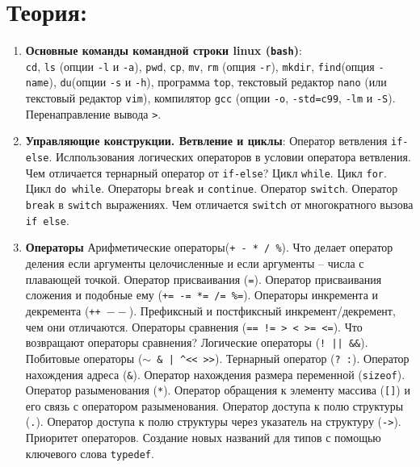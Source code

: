 \documentclass{article}
\begin{document}

\section*{Теория:}
\begin{enumerate}
\item \textbf{Основные команды командной строки linux (\texttt{bash})}:\\
 \texttt{cd}, \texttt{ls} (опции \texttt{-l} и \texttt{-a}), \texttt{pwd}, \texttt{cp}, \texttt{mv}, \texttt{rm} (опция \texttt{-r}), \texttt{mkdir}, \texttt{find}(опция \texttt{-name}), \texttt{du}(опции \texttt{-s} и \texttt{-h}), программа \texttt{top}, текстовый редактор \texttt{nano} (или текстовый редактор \texttt{vim}), компилятор \texttt{gcc} (опции \texttt{-o}, \texttt{-std=c99}, \texttt{-lm} и \texttt{-S}). Перенаправление вывода \texttt{>}.


\item \textbf{Управляющие конструкции. Ветвление и циклы}:
Оператор ветвления \texttt{if-else}. Ислпользования логических операторов в условии оператора ветвления. Чем отличается тернарный оператор от \texttt{if-else}? Цикл \texttt{while}. Цикл \texttt{for}. Цикл \texttt{do while}. Операторы \texttt{break} и \texttt{continue}. Оператор \texttt{switch}. Оператор \texttt{break} в \texttt{switch} выражениях. Чем отличается \texttt{switch} от многократного вызова \texttt{if else}.

\item \textbf{Операторы}
Арифметические операторы(\texttt{+ - * / \%}). Что делает оператор деления если аргументы целочисленные и если аргументы -- числа с плавающей точкой. Оператор присваивания (\texttt{=}). Оператор присваивания сложения и подобные ему (\texttt{+= -= *= /= \%=}). Операторы инкремента и декремента (\texttt{++  $--$}). Префиксный  и постфиксный инкремент/декремент, чем они отличаются. Операторы сравнения (\texttt{== != > < >= <=}). Что возвращают операторы сравнения? Логические операторы (\texttt{!  ||  \&\&}). Побитовые операторы (\texttt{$\sim$  \&  |  \textasciicircum \quad <{}<  >{}>}). Тернарный оператор (\texttt{? :}). Оператор нахождения адреса (\texttt{\&}). Оператор нахождения размера переменной (\texttt{sizeof}). Оператор разыменования (\texttt{*}). Оператор обращения к элементу массива (\texttt{[]}) и его связь с оператором разыменования. Оператор доступа к полю структуры (\texttt{.}). Оператор доступа к полю структуры через указатель на структуру (\texttt{->}). Приоритет операторов. Создание новых названий для типов с помощью ключевого слова \texttt{typedef}.



\end{enumerate}
\end{document}
